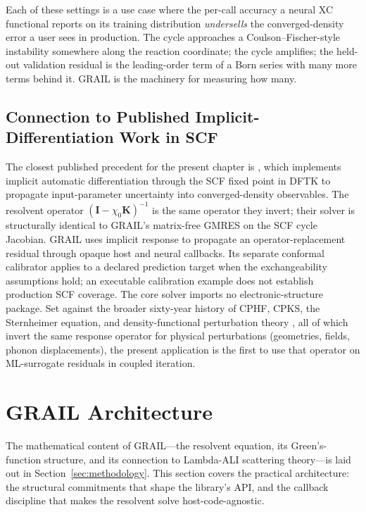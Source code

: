 \documentclass[11pt]{article}
\begin{document}
Each of these settings is a use case where the per-call accuracy a
neural XC functional reports on its training distribution
\emph{undersells} the converged-density error a user sees in
production.  The cycle approaches a Coulson--Fischer-style
instability somewhere along the reaction coordinate; the cycle
amplifies; the held-out validation residual is the leading-order
term of a Born series with many more terms behind it.  GRAIL is the
machinery for measuring how many.

\subsection{Connection to Published Implicit-Differentiation Work in SCF}
\label{sec:scf-related-work}

The closest published precedent for the present chapter is
\citet{Schmitz2025}, which implements implicit automatic
differentiation
through the SCF fixed point in DFTK to propagate input-parameter
uncertainty into converged-density observables.  The resolvent
operator $(\mathbf{I} - \chi_0\mathbf{K})^{-1}$ is the same operator
they invert; their solver is structurally identical to GRAIL's
matrix-free GMRES on the SCF cycle Jacobian.  GRAIL uses implicit response to propagate an operator-replacement residual
through opaque host and neural callbacks. Its separate conformal calibrator
applies to a declared prediction target when the exchangeability assumptions
hold; an executable calibration example does not establish production SCF
coverage. The core solver imports no electronic-structure package.
Set
against the broader sixty-year history of CPHF, CPKS, the Sternheimer
equation, and density-functional perturbation theory
\citep{Baroni2001}, all of which invert the same response operator
for physical perturbations (geometries, fields, phonon
displacements), the present application is the first to use that
operator on ML-surrogate residuals in coupled iteration.

\section{GRAIL Architecture}
\label{sec:resolvent}

The mathematical content of GRAIL---the resolvent equation, its
Green's-function structure, and its connection to Lambda-ALI scattering
theory---is laid out in Section~\ref{sec:methodology}.  This section
covers the practical architecture: the structural commitments that
shape the library's API, and the callback discipline that makes the
resolvent solve host-code-agnostic.
\end{document}
